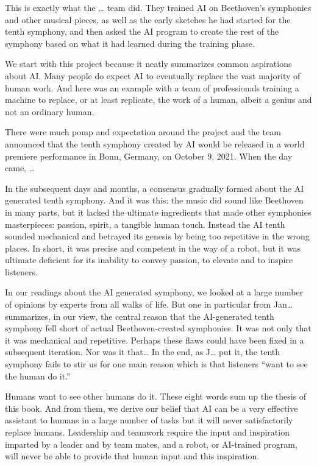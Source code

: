 \documentclass[
  Letterpaper,
]{scrbook}
\begin{document}
This is exactly what the \ldots{} team did. They trained AI on
Beethoven's symphonies and other musical pieces, as well as the early
sketches he had started for the tenth symphony, and then asked the AI
program to create the rest of the symphony based on what it had learned
during the training phase.

We start with this project because it neatly summarizes common
aspirations about AI. Many people do expect AI to eventually replace the
vast majority of human work. And here was an example with a team of
professionals training a machine to replace, or at least replicate, the
work of a human, albeit a genius and not an ordinary human.

There were much pomp and expectation around the project and the team
announced that the tenth symphony created by AI would be released in a
world premiere performance in Bonn, Germany, on October 9, 2021. When
the day came, \ldots{}

In the subsequent days and months, a consensus gradually formed about
the AI generated tenth symphony. And it was this: the music did sound
like Beethoven in many parts, but it lacked the ultimate ingredients
that made other symphonies masterpieces: passion, spirit, a tangible
human touch. Instead the AI tenth sounded mechanical and betrayed its
genesis by being too repetitive in the wrong places. In short, it was
precise and competent in the way of a robot, but it was ultimate
deficient for its inability to convey passion, to elevate and to inspire
listeners.

In our readings about the AI generated symphony, we looked at a large
number of opinions by experts from all walks of life. But one in
particular from Jan\ldots{} summarizes, in our view, the central reason
that the AI-generated tenth symphony fell short of actual
Beethoven-created symphonies. It was not only that it was mechanical and
repetitive. Perhaps these flaws could have been fixed in a subsequent
iteration. Nor was it that\ldots{} In the end, as J\ldots{} put it, the
tenth symphony fails to stir us for one main reason which is that
listeners ``want to see the human do it.''

Humans want to see other humans do it. These eight words sum up the
thesis of this book. And from them, we derive our belief that AI can be
a very effective assistant to humans in a large number of tasks but it
will never satisfactorily replace humans. Leadership and teamwork
require the input and inspiration imparted by a leader and by team
mates, and a robot, or AI-trained program, will never be able to provide
that human input and this inspiration.
\end{document}
